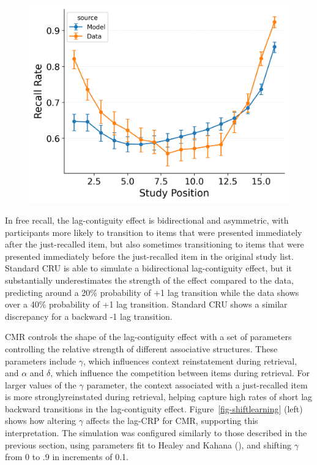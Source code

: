 \documentclass[
  man,
  floatsintext,
  longtable,
  nolmodern,
  notxfonts,
  notimes,
  draftfirst,
  colorlinks=true,linkcolor=blue,citecolor=blue,urlcolor=blue]{apa7}
\begin{document}
\begin{figure}
\begin{minipage}{0.33\linewidth}
\includegraphics{figures/HealeyKahana2014_CRU_with_Feature-to-Context__Pre-Expt__Primacy__and_StartDrift_Fitting_spc.png}\end{minipage}%

\end{figure}%

In free recall, the lag-contiguity effect is bidirectional and
asymmetric, with participants more likely to transition to items that
were presented immediately after the just-recalled item, but also
sometimes transitioning to items that were presented immediately before
the just-recalled item in the original study list. Standard CRU is able
to simulate a bidirectional lag-contiguity effect, but it substantially
underestimates the strength of the effect compared to the data,
predicting around a 20\% probability of +1 lag transition while the data
shows over a 40\% probability of +1 lag transition. Standard CRU shows a
similar discrepancy for a backward -1 lag transition.

CMR controls the shape of the lag-contiguity effect with a set of
parameters controlling the relative strength of different associative
structures. These parameters include \(\gamma\), which influences
context reinstatement during retrieval, and \(\alpha\) and \(\delta\),
which influence the competition between items during retrieval. For
larger values of the \(\gamma\) parameter, the context associated with a
just-recalled item is more stronglyreinstated during retrieval, helping
capture high rates of short lag backward transitions in the
lag-contiguity effect. Figure~\ref{fig-shiftlearning} (left) shows how
altering \(\gamma\) affects the lag-CRP for CMR, supporting this
interpretation. The simulation was configured similarly to those
described in the previous section, using parameters fit to Healey and
Kahana (), and shifting \(\gamma\)
from 0 to .9 in increments of 0.1.
\end{document}
